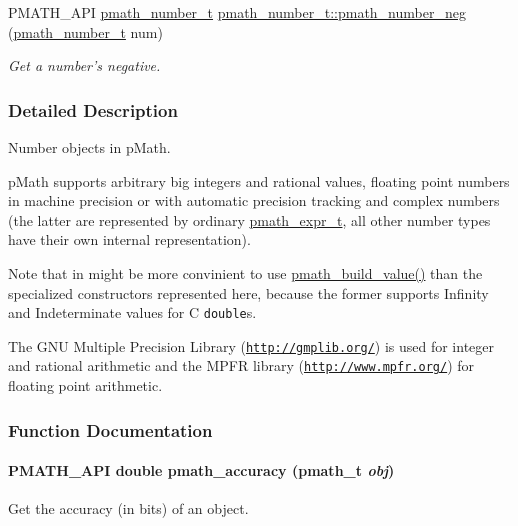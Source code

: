 \begin{CompactItemize}
PMATH\_\-API \hyperlink{classpmath__number__t}{pmath\_\-number\_\-t} \hyperlink{group__numbers_gfbfb5ee7f7cd966432e1cee6fa5b6bf5}{pmath\_\-number\_\-t::pmath\_\-number\_\-neg} (\hyperlink{classpmath__number__t}{pmath\_\-number\_\-t} num)
\begin{CompactList}\small\item\em Get a number's negative. \item\end{CompactList}\end{CompactItemize}


\subsubsection{Detailed Description}
Number objects in pMath. 

pMath supports arbitrary big integers and rational values, floating point numbers in machine precision or with automatic precision tracking and complex numbers (the latter are represented by ordinary \hyperlink{classpmath__expr__t}{pmath\_\-expr\_\-t}, all other number types have their own internal representation).

Note that in might be more convinient to use \hyperlink{group__helpers_g13a748aa283c5f5408cce037d3ad224d}{pmath\_\-build\_\-value()} than the specialized constructors represented here, because the former supports Infinity and Indeterminate values for C {\tt double}s.

The GNU Multiple Precision Library (\href{http://gmplib.org/}{\tt http://gmplib.org/}) is used for integer and rational arithmetic and the MPFR library (\href{http://www.mpfr.org/}{\tt http://www.mpfr.org/}) for floating point arithmetic. 

\subsubsection{Function Documentation}
\hypertarget{group__numbers_g801920d9e9a6b4c04fa45e664a82dc10}{
\paragraph[{pmath\_\-accuracy}]{\setlength{\rightskip}{0pt plus 5cm}PMATH\_\-API double pmath\_\-accuracy ({\bf pmath\_\-t} {\em obj})}\hfill}
\label{group__numbers_g801920d9e9a6b4c04fa45e664a82dc10}


Get the accuracy (in bits) of an object. 

